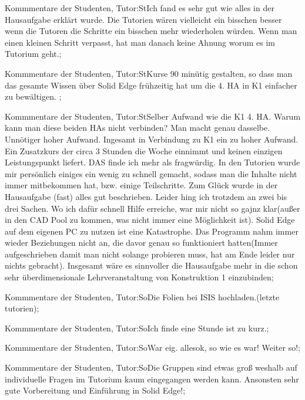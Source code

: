 \documentclass[10pt]{beamer}
\begin{document}
\begin{frame}[fragile]{Kommmentare der Studenten, Tutor:St}Ich fand es sehr gut wie alles in der Hausaufgabe erklärt wurde. Die Tutorien wären vielleicht ein bisschen besser wenn die Tutoren die Schritte ein bisschen mehr wiederholen würden. Wenn man einen kleinen Schritt verpasst, hat man danach keine Ahnung worum es im Tutorium geht.;
 \end{frame}
\begin{frame}[fragile]{Kommmentare der Studenten, Tutor:St}Kurse 90 minütig gestalten, so dass man das gesamte Wissen über Solid Edge frühzeitig hat um die 4. HA in K1 einfacher zu bewältigen.  ;
 \end{frame}
\begin{frame}[fragile]{Kommmentare der Studenten, Tutor:St}Selber Aufwand wie die K1 4. HA. Warum kann man diese beiden HAs nicht verbinden? Man macht genau dasselbe. Unnötiger hoher Aufwand. Ingesamt in Verbindung zu K1 ein zu hoher Aufwand. Ein Zusatzkurs der circa 3 Stunden die Woche einnimmt und keinen einzigen Leistungspunkt liefert. DAS finde ich mehr als fragwürdig.  In den Tutorien wurde mir persönlich einiges ein wenig zu schnell gemacht, sodass man die Inhalte nicht immer mitbekommen hat, bzw. einige Teilschritte. Zum Glück wurde in der Hausaufgabe (fast) alles gut beschrieben. Leider hing ich trotzdem an zwei bis drei Sachen. Wo ich dafür schnell Hilfe erreiche, war mir nicht so gajnz klar(außer in den CAD Pool zu kommen, was nicht immer eine Möglichkeit ist). Solid Edge auf dem eigenen PC zu nutzen ist eine Katastrophe. Das Programm nahm immer wieder Beziehungen nicht an, die davor genau so funktioniert hatten(Immer aufgeschrieben damit man nicht solange probieren muss, hat am Ende leider nur nichts gebracht). Insgesamt wäre es sinnvoller die Hausaufgabe mehr in die schon sehr überdimensionale Lehrveranstaltung von Konstruktion 1 einzubinden;
 \end{frame}
\begin{frame}[fragile]{Kommmentare der Studenten, Tutor:So}Die Folien bei ISIS hochladen.(letzte tutorien);
 \end{frame}
\begin{frame}[fragile]{Kommmentare der Studenten, Tutor:So}Ich finde eine Stunde ist zu kurz.;
 \end{frame}
\begin{frame}[fragile]{Kommmentare der Studenten, Tutor:So}War eig. allesok, so wie es war!
 Weiter so!;
 \end{frame}
\begin{frame}[fragile]{Kommmentare der Studenten, Tutor:So}Die Gruppen sind etwas groß weshalb auf individuelle Fragen im Tutorium kaum eingegangen werden kann. Ansonsten sehr gute Vorbereitung und Einführung in Solid Edge!;
 \end{frame}
\end{document}
